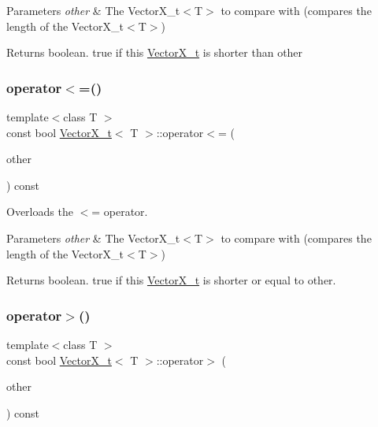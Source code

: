 \begin{DoxyParams}{Parameters}
{\em other} & The Vector\+X\+\_\+t$<$\+T$>$ to compare with (compares the length of the Vector\+X\+\_\+t$<$\+T$>$)\\
\hline
\end{DoxyParams}
\begin{DoxyReturn}{Returns}
boolean. true if this \hyperlink{class_vector_x__t}{Vector\+X\+\_\+t} is shorter than other 
\end{DoxyReturn}
\mbox{\label{class_vector_x__t_a4aa8b297bdb6c3e51c004520bff95f73}} 
\subsubsection{\texorpdfstring{operator$<$=()}{operator<=()}}
{\footnotesize\ttfamily template$<$class T $>$ \\
const bool \hyperlink{class_vector_x__t}{Vector\+X\+\_\+t}$<$ T $>$\+::operator$<$= (\begin{DoxyParamCaption}\item[{\hyperlink{class_vector_x__t}{Vector\+X\+\_\+t}$<$ T $>$}]{other }\end{DoxyParamCaption}) const}



Overloads the $<$= operator. 


\begin{DoxyParams}{Parameters}
{\em other} & The Vector\+X\+\_\+t$<$\+T$>$ to compare with (compares the length of the Vector\+X\+\_\+t$<$\+T$>$)\\
\hline
\end{DoxyParams}
\begin{DoxyReturn}{Returns}
boolean. true if this \hyperlink{class_vector_x__t}{Vector\+X\+\_\+t} is shorter or equal to other. 
\end{DoxyReturn}
\mbox{\label{class_vector_x__t_a311676a873e6851386a71d5b781d77fc}} 
\subsubsection{\texorpdfstring{operator$>$()}{operator>()}}
{\footnotesize\ttfamily template$<$class T $>$ \\
const bool \hyperlink{class_vector_x__t}{Vector\+X\+\_\+t}$<$ T $>$\+::operator$>$ (\begin{DoxyParamCaption}\item[{\hyperlink{class_vector_x__t}{Vector\+X\+\_\+t}$<$ T $>$}]{other }\end{DoxyParamCaption}) const}



